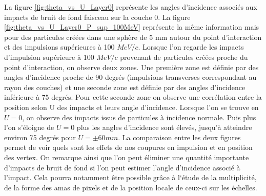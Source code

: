 %   
  
  \medskip
  
  La figure \ref{fig:theta_vs_U_Layer0} repr\'esente les angles d'incidence associ\'es aux impacts de bruit de fond faisceau sur la couche 0. La figure \ref{fig:theta_vs_U_Layer0_P_sup_100MeV} repr\'esente la m\^eme information mais pour des particules cr\'e\'ees dans une sph\`ere de 5 mm autour du point d'interaction et des impulsions sup\'erieures \`a 100 $MeV/c$. Lorsque l'on regarde les impacts d'impulsion sup\'erieure \`a 100 $MeV/c$ provenant de particules cr\'e\'ees proche du point d'interaction, on observe deux zones. Une premi\`ere zone est d\'efinie par des angles d'incidence proche de 90 degr\'es (impulsions transverses correspondant au rayon des couches) et une seconde zone est d\'efinie par des angles d'incidence inf\'erieure \`a 75 degr\'es. Pour cette seconde zone on observe une corr\'elation entre la position selon U des impacts et leurs angle d'incidence. Lorsque l'on se trouve en $U=0$, on observe des impacts issus de particules \`a incidence normale. Puis plus l'on s'\'eloigne de $U=0$ plus les angles d'incidence sont \'elev\'es, jusqu'à atteindre environ 75 degr\'es pour $U = \pm 60 mm$. La comparaison entre les deux figures permet de voir quels sont les effets de nos coupures en impulsion et en position des vertex. On remarque ainsi que l'on peut \'eliminer une quantit\'e importante d'impacts de bruit de fond si l'on peut estimer l'angle d'incidence associ\'e \`a l'impact. Cela pourra notamment \^etre possible gr\^ace \`a l`\'etude de la multiplicit\'e, de la forme des amas de pixels et de la position locale de ceux-ci sur les \'echelles.
  
